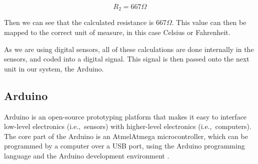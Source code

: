 \begin{equation}
R_{2} = 667\Omega
\end{equation} 

Then we can see that the calculated resistance is 667$\Omega$. This value can then be mapped to the correct unit of measure, in this case Celsius or Fahrenheit. 

As we are using digital sensors, all of these calculations are done internally in the sensors, and coded into a digital signal. This signal is then passed onto the next unit in our system, the Arduino.  

\subsection{Arduino}

Arduino is an open-source prototyping platform that makes it easy to interface low-level electronics (i.e.,~sensors) with higher-level electronics (i.e.,~computers). The core part of the Arduino is an Atmel\texttrademark Atmega microcontroller, which can be programmed by a computer over a USB port, using the Arduino programming language and the Arduino development environment \citep{Arduino}.



